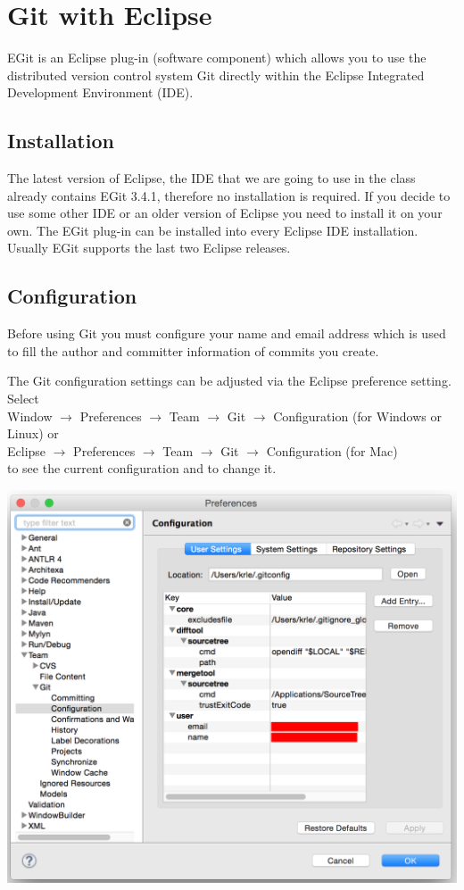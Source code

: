 \documentclass{article}
\begin{document}
\fi
\newpage


\section{Git with Eclipse}

EGit is an Eclipse plug-in (software component) which allows you to
use the distributed version control system Git directly within the
Eclipse Integrated Development Environment (IDE). 

\subsection{Installation}
The latest version of Eclipse, the IDE that we are going to use in the
class already contains EGit 3.4.1, therefore no installation is
required. If you decide to use some other IDE or an older version of
Eclipse you need to install it on your own.
The EGit plug-in can be installed into every Eclipse IDE
installation. Usually EGit supports the last two Eclipse releases.

\subsection{Configuration}

Before using Git you must configure your name and email address which
is used to fill the author and committer information of commits you
create. 

The Git configuration settings can be adjusted via the Eclipse
preference setting. 
Select \\
Window $\rightarrow$ Preferences $\rightarrow$ Team
$\rightarrow$ Git $\rightarrow$ Configuration  (for Windows or Linux)
or\\
Eclipse $\rightarrow$ Preferences $\rightarrow$ Team
$\rightarrow$ Git $\rightarrow$ Configuration (for Mac)\\
to see the current configuration and to change it. 

\begin{center}
\includegraphics[scale=0.5]{figures/s3.png}
\end{center}
\end{document}
